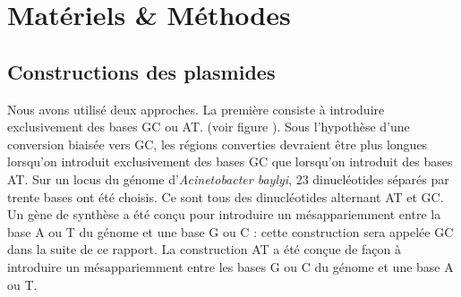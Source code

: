 

\section{Matériels \& Méthodes}
\label{sec:materiel}


\subsection{Constructions des plasmides}
\label{subsec:constructions}


Nous avons utilisé deux approches. La première consiste à introduire
exclusivement des bases GC ou AT. (voir figure \label{img:strategie}). Sous
l'hypothèse d'une conversion biaisée vers GC, les régions converties devraient
être plus longues lorsqu'on introduit exclusivement des bases GC que lorsqu'on
introduit des bases AT. Sur un locus du génome d'\emph{Acinetobacter
  baylyi}, 23 dinucléotides séparés par trente bases ont été choisis. Ce sont
tous des dinucléotides alternant AT et GC. Un gène de synthèse a été conçu pour
introduire un mésappariemment entre la base A ou T du génome et une base G ou C
: cette construction sera appelée GC dans la suite de ce rapport. La
construction AT a été conçue de façon à introduire un mésappariemment entre les
bases G ou C du génome et une base A ou T.

